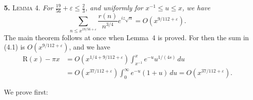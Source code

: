 \documentclass[11pt]{article}
\newcommand{\dd}{\,d}
\begin{document}
\medskip
\noindent\textbf{5.} \textsc{Lemma 4.}
\textit{For $\frac{19}{56}+\varepsilon\leq\frac23$, and uniformly for
$x^{-1}\leq u\leq x$, we have}
\begin{equation}
 \sum_{n\leq x^{19/56+\varepsilon}}\frac{r(n)}{n^{3/4}}e^{iz\sqrt n}
 =O\!\left(x^{9/112+\varepsilon}\right).
 \tag{5.1}
\end{equation}
The main theorem follows at once when Lemma~4 is proved. For then the sum in
(4.1) is $O(x^{9/112+\varepsilon})$, and we have
\begin{align*}
 \mathrm{R}(x)-\pi x
 &=O\!\left(x^{1/4+9/112+\varepsilon}\right)
 \int_{x^{-1}}^x e^{-u}u^{1/(4s)}\dd u \\
 &=O\!\left(x^{37/112+\varepsilon}\right)
 \int_0^\infty e^{-u}(1+u)\dd u
 =O\!\left(x^{37/112+\varepsilon}\right).
\end{align*}

We prove first:
\end{document}
